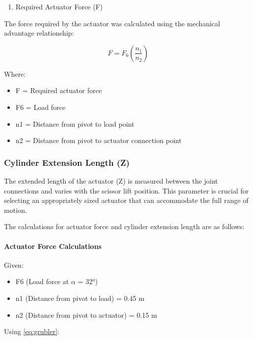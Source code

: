 \documentclass[../../main]{subfiles}
\begin{document}
\begin{enumerate}
\def\labelenumi{\arabic{enumi}.}
\item
  Required Actuator Force (F)
\end{enumerate}

The force required by the actuator was calculated using the mechanical
advantage relationship:

\begin{equation}
  F = F_6 \left(\frac{n_1}{n_2}\right)
\end{equation}

Where:

\begin{itemize}
\item
  F = Required actuator force
\item
  F6 = Load force
\item
  n1 = Distance from pivot to load point
\item
  n2 = Distance from pivot to actuator connection point
\end{itemize}



\subsubsection{Cylinder Extension Length (Z)}


The extended length of the actuator (Z) is measured between the joint
connections and varies with the scissor lift position. This parameter is
crucial for selecting an appropriately sized actuator that can
accommodate the full range of motion.

The calculations for actuator force and cylinder extension length are as
follows:

\paragraph{Actuator Force Calculations}

Given:

\begin{itemize}
\item
  F6 (Load force at $\alpha$ = 32°)
\item
  n1 (Distance from pivot to load) = 0.45 m
\item
  n2 (Distance from pivot to actuator) = 0.15 m
\end{itemize}

Using \cref{eq:grubler}:
\end{document}
